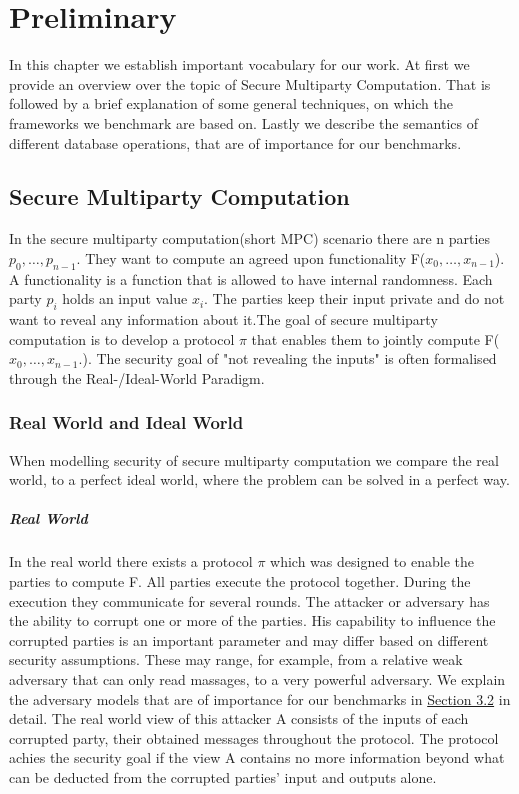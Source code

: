 \chapter{Preliminary}
In this chapter we establish important vocabulary for our work. At first we provide an overview over the topic of Secure Multiparty Computation. That is followed by a brief explanation of some general techniques, on which the frameworks we benchmark are based on. 
Lastly we describe the semantics of different database operations, that are of importance for our benchmarks.  
\section{Secure Multiparty Computation}
In the secure multiparty computation(short MPC) scenario there are n parties 
$ p_0,\dots,p_{n-1} $. They want to compute an agreed upon functionality F($ x_0,\dots,x_{n-1} $). A functionality is a function that is allowed to have internal randomness. 
Each party $ p_i $ holds an input value $ x_i $. 
The parties keep their input private and do not want to reveal any information about it.The goal of secure multiparty computation is to develop a protocol  $ \pi $ that enables them to jointly compute F($ x_0,\dots,x_{n-1}. $). The security goal of "not revealing the inputs" is often formalised through the Real-/Ideal-World Paradigm. 


\subsection{Real World and Ideal World}
When modelling security of secure multiparty computation we compare the real world, to a perfect ideal world, where the problem can be solved in a perfect way.
\paragraph{Real World}
In the real world there exists a protocol $\pi $ which was designed to enable the parties to compute F. All parties execute the protocol together. During the execution they communicate for several rounds. The attacker or adversary has the ability to corrupt one or more of the parties. His capability to influence the corrupted parties is an important parameter and may differ based on different security assumptions. These may range, for example, from a relative weak adversary that can only read massages, to a very powerful adversary. We explain the adversary models that are of importance for our benchmarks in \hyperref[sec:Adversarial Models]{Section 3.2} in detail.
The real world view of this attacker A consists of the inputs of each corrupted party, their obtained messages throughout the protocol. The protocol achies the security goal if the view A contains no more information beyond what can be deducted from the corrupted parties' input and outputs alone. 
